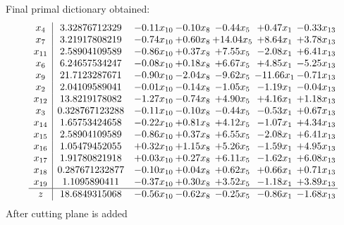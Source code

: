 \documentclass[8pt]{article}
\begin{document}
 Final primal dictionary obtained: 
\[\begin{array}{c| c c@{\hskip 2pt} c@{\hskip 2pt} c@{\hskip 2pt} c@{\hskip 2pt} c@{\hskip 2pt} }
 x_{4}   &  3.32876712329 & -0.11 x_{10} & -0.10 x_{8} & -0.44 x_{5} & +  0.47 x_{1} & -0.33 x_{13}\\
 x_{7}   &  3.21917808219 & -0.74 x_{10} & +  0.60 x_{8} & + 14.04 x_{5} & +  8.64 x_{1} & +  3.78 x_{13}\\
 x_{11}   &  2.58904109589 & -0.86 x_{10} & +  0.37 x_{8} & +  7.55 x_{5} & -2.08 x_{1} & +  6.41 x_{13}\\
 x_{6}   &  6.24657534247 & -0.08 x_{10} & +  0.18 x_{8} & +  6.67 x_{5} & +  4.85 x_{1} & -5.25 x_{13}\\
 x_{9}   &  21.7123287671 & -0.90 x_{10} & -2.04 x_{8} & -9.62 x_{5} & -11.66 x_{1} & -0.71 x_{13}\\
 x_{2}   &  2.04109589041 & -0.01 x_{10} & -0.14 x_{8} & -1.05 x_{5} & -1.19 x_{1} & -0.04 x_{13}\\
 x_{12}   &  13.8219178082 & -1.27 x_{10} & -0.74 x_{8} & +  4.90 x_{5} & +  4.16 x_{1} & +  1.18 x_{13}\\
 x_{3}   &  0.328767123288 & -0.11 x_{10} & -0.10 x_{8} & -0.44 x_{5} & -0.53 x_{1} & +  0.67 x_{13}\\
 x_{14}   &  1.65753424658 & -0.22 x_{10} & +  0.81 x_{8} & +  4.12 x_{5} & -1.07 x_{1} & +  4.34 x_{13}\\
 x_{15}   &  2.58904109589 & -0.86 x_{10} & +  0.37 x_{8} & +  6.55 x_{5} & -2.08 x_{1} & +  6.41 x_{13}\\
 x_{16}   &  1.05479452055 & +  0.32 x_{10} & +  1.15 x_{8} & +  5.26 x_{5} & -1.59 x_{1} & +  4.95 x_{13}\\
 x_{17}   &  1.91780821918 & +  0.03 x_{10} & +  0.27 x_{8} & +  6.11 x_{5} & -1.62 x_{1} & +  6.08 x_{13}\\
 x_{18}   &  0.287671232877 & -0.10 x_{10} & +  0.04 x_{8} & +  0.62 x_{5} & +  0.66 x_{1} & +  0.71 x_{13}\\
 x_{19}   &  1.1095890411 & -0.37 x_{10} & +  0.30 x_{8} & +  3.52 x_{5} & -1.18 x_{1} & +  3.89 x_{13}\\
\hline
z    &  18.6849315068 & -0.56 x_{10} & -0.62 x_{8} & -0.25 x_{5} & -0.86 x_{1} & -1.68 x_{13}\\
\end{array}\]
 After cutting plane is added 
\end{document}
